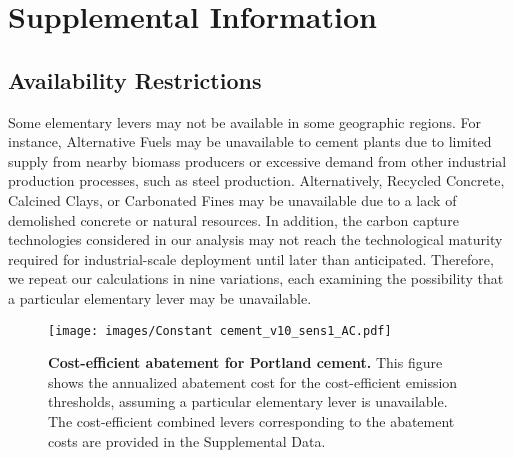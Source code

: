 \documentclass[12pt, a4paper]{article} %
\newcommand{\Suppl}{Supplemental}
\begin{document}


\section*{\Suppl$ $ Information}

\subsection{Availability Restrictions}
\label{sec: sn-restrictions}

Some elementary levers may not be available in some geographic regions. For instance, Alternative Fuels may be unavailable to cement plants due to limited supply from nearby biomass producers or excessive demand from other industrial production processes, such as steel production. Alternatively, Recycled Concrete, Calcined Clays, or Carbonated Fines may be unavailable due to a lack of demolished concrete or natural resources. In addition, the carbon capture technologies considered in our analysis may not reach the technological maturity required for industrial-scale deployment until later than anticipated. Therefore, we repeat our calculations in nine variations, each examining the possibility that a particular elementary lever may be unavailable.

\begin{figure}[ht]
\centering
\texttt{[image: images/Constant cement\_v10\_sens1\_AC.pdf]}
\caption{\textbf{Cost-efficient abatement for Portland cement.} This figure shows the annualized abatement cost for the cost-efficient emission thresholds, assuming a particular elementary lever is unavailable. The cost-efficient combined levers corresponding to the abatement costs are provided in the \Suppl$ $ Data.}
\label{fig: sens1_ac}
\end{figure}
\end{document}
